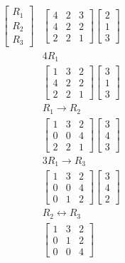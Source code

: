 \documentclass[11pt]{article}
\begin{document}
\begin{flushleft}
\begin{align*}
\begin{bmatrix}
R_1 \\ R_2 \\ R_3
\end{bmatrix}
&\begin{bmatrix}
4 & 2 & 3 \\
4 & 2 & 2 \\
2 & 2 & 1
\end{bmatrix}
\begin{bmatrix}
2 \\ 1 \\ 3
\end{bmatrix}\\
&4R_1 \\
&\begin{bmatrix}
1 & 3 & 2 \\
4 & 2 & 2 \\
2 & 2 & 1
\end{bmatrix}
\begin{bmatrix}
3 \\ 1 \\ 3
\end{bmatrix}\\
&R_1 \rightarrow R_2 \\
&\begin{bmatrix}
1 & 3 & 2 \\
0 & 0 & 4 \\
2 & 2 & 1
\end{bmatrix}
\begin{bmatrix}
3 \\ 4 \\ 3
\end{bmatrix}\\
&3R_1 \rightarrow R_3 \\
&\begin{bmatrix}
1 & 3 & 2 \\
0 & 0 & 4 \\
0 & 1 & 2
\end{bmatrix}
\begin{bmatrix}
3 \\ 4 \\ 2
\end{bmatrix}\\
&R_2 \leftrightarrow R_3 \\
&\begin{bmatrix}
1 & 3 & 2 \\
0 & 1 & 2 \\
0 & 0 & 4
\end{bmatrix}

\end{align*}
\end{flushleft}
\end{document}
